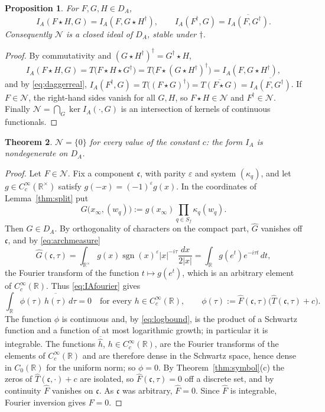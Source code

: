 \documentclass[11pt]{amsart}
\newtheorem{theorem}{Theorem}[section]
\newtheorem{proposition}[theorem]{Proposition}
\theoremstyle{definition}
\theoremstyle{remark}
\newcommand{\R}{\mathbb R}
\newcommand{\sgn}{\operatorname{sgn}}
\newcommand{\Th}{\widehat{T}}
\newcommand{\DA}{D_A}
\newcommand{\Nrad}{\mathcal N}
\begin{document}
\begin{proposition}\label{prop:ideal}
For $F,G,H\in\DA$,
\[
I_A(F\star H,G)=I_A(F,G\star H^{\dagger}),\qquad
I_A(F^{\dagger},G)=\overline{I_A(F,G^{\dagger})} .
\]
Consequently $\Nrad$ is a closed ideal of $\DA$, stable under $\dagger$.
\end{proposition}

\begin{proof}
By commutativity and $(G\star H^{\dagger})^{\dagger}=G^{\dagger}\star H$,
\[
I_A(F\star H,G)=T\bigl(F\star H\star G^{\dagger}\bigr)
=T\bigl(F\star(G\star H^{\dagger})^{\dagger}\bigr)=I_A(F,G\star H^{\dagger}),
\]
and by \eqref{eq:daggerreal},
$I_A(F^{\dagger},G)=T\bigl((F\star G)^{\dagger}\bigr)=\overline{T(F\star G)}
=\overline{I_A(F,G^{\dagger})}$.  If $F\in\Nrad$, the right-hand sides vanish
for all $G,H$, so $F\star H\in\Nrad$ and $F^{\dagger}\in\Nrad$.  Finally
$\Nrad=\bigcap_G\ker I_A(\cdot,G)$ is an intersection of kernels of continuous
functionals.
\end{proof}

\begin{theorem}\label{thm:radical}
$\Nrad=\{0\}$ for every value of the constant $c$: the form $I_A$ is
nondegenerate on $\DA$.
\end{theorem}

\begin{proof}
Let $F\in\Nrad$.  Fix a component $\mathfrak c$, with parity $\varepsilon$ and
system $(\kappa_q)$, and let $g\in C_c^{\infty}(\R^{\times})$ satisfy
$g(-x)=(-1)^{\varepsilon}g(x)$.  In the coordinates of Lemma~\ref{thm:split}
put
\[
G\bigl(x_{\infty},(w_q)\bigr):=g(x_{\infty})\prod_{q\in S_f}\kappa_q(w_q).
\]
Then $G\in\DA$.  By orthogonality of characters on the compact part,
$\widehat G$ vanishes off $\mathfrak c$, and by \eqref{eq:archmeasure}
\[
\widehat G(\mathfrak c,\tau)=\int_{\R^{\times}}g(x)\sgn(x)^{\varepsilon}
|x|^{-i\tau}\frac{dx}{2|x|}=\int_{\R}g(e^{t})e^{-i\tau t}\,dt ,
\]
the Fourier transform of the function $t\mapsto g(e^{t})$, which is an
arbitrary element of $C_c^{\infty}(\R)$.  Thus \eqref{eq:IAfourier} gives
\[
\int_{\R}\phi(\tau)\,\overline{\widehat h(\tau)}\,d\tau=0
\quad\text{for every }h\in C_c^{\infty}(\R),\qquad
\phi(\tau):=\widehat F(\mathfrak c,\tau)\bigl(\Th(\mathfrak c,\tau)+c\bigr).
\]
The function $\phi$ is continuous and, by \eqref{eq:logbound}, is the product of
a Schwartz function and a function of at most logarithmic growth; in
particular it is integrable.  The functions $\overline{\widehat h}$,
$h\in C_c^{\infty}(\R)$, are the Fourier transforms of the elements of
$C_c^{\infty}(\R)$ and are therefore dense in the Schwartz space, hence dense
in $C_0(\R)$ for the uniform norm; so $\phi=0$.  By Theorem~\ref{thm:symbol}(c)
the zeros of $\Th(\mathfrak c,\cdot)+c$ are isolated, so
$\widehat F(\mathfrak c,\tau)=0$ off a discrete set, and by continuity
$\widehat F$ vanishes on $\mathfrak c$.  As $\mathfrak c$ was arbitrary,
$\widehat F=0$.  Since $\widehat F$ is integrable, Fourier inversion gives
$F=0$.
\end{proof}
\end{document}
